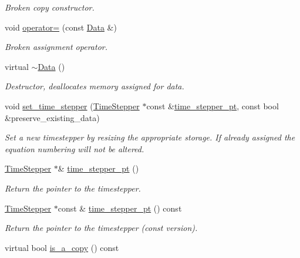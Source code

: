 \begin{DoxyCompactItemize}
\begin{DoxyCompactList}\small\item\em Broken copy constructor. \end{DoxyCompactList}\item 
void \hyperlink{classoomph_1_1Data_ae68161e2bb30db0938b09db2f8fb4c9d}{operator=} (const \hyperlink{classoomph_1_1Data}{Data} \&)
\begin{DoxyCompactList}\small\item\em Broken assignment operator. \end{DoxyCompactList}\item 
virtual \hyperlink{classoomph_1_1Data_a91d15d22184e0488123d856ea4c455f8}{$\sim$\+Data} ()
\begin{DoxyCompactList}\small\item\em Destructor, deallocates memory assigned for data. \end{DoxyCompactList}\item 
void \hyperlink{classoomph_1_1Data_acd22fabfb127ff4ea37a5bc60c61b414}{set\+\_\+time\+\_\+stepper} (\hyperlink{classoomph_1_1TimeStepper}{Time\+Stepper} $\ast$const \&\hyperlink{classoomph_1_1Data_a5b34970d16205921dca3ada720da8445}{time\+\_\+stepper\+\_\+pt}, const bool \&preserve\+\_\+existing\+\_\+data)
\begin{DoxyCompactList}\small\item\em Set a new timestepper by resizing the appropriate storage. If already assigned the equation numbering will not be altered. \end{DoxyCompactList}\item 
\hyperlink{classoomph_1_1TimeStepper}{Time\+Stepper} $\ast$\& \hyperlink{classoomph_1_1Data_a5b34970d16205921dca3ada720da8445}{time\+\_\+stepper\+\_\+pt} ()
\begin{DoxyCompactList}\small\item\em Return the pointer to the timestepper. \end{DoxyCompactList}\item 
\hyperlink{classoomph_1_1TimeStepper}{Time\+Stepper} $\ast$const  \& \hyperlink{classoomph_1_1Data_acd3e933171913b8cf3f4f0c4020ad449}{time\+\_\+stepper\+\_\+pt} () const
\begin{DoxyCompactList}\small\item\em Return the pointer to the timestepper (const version). \end{DoxyCompactList}\item 
virtual bool \hyperlink{classoomph_1_1Data_a736feee0f95ab3d542c70db6ca7ab233}{is\+\_\+a\+\_\+copy} () const

\end{DoxyCompactItemize}
